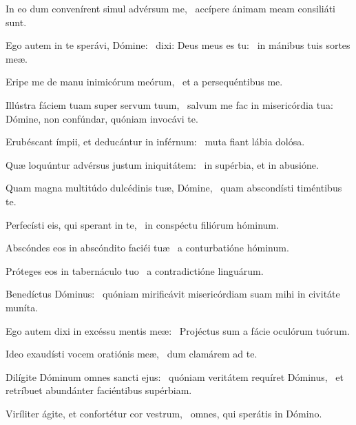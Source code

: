 \item In eo dum convenírent simul advérsum me,~\psstar{} accípere ánimam meam consiliáti sunt.

\item Ego autem in te sperávi, Dómine:~\pscross{} dixi: Deus meus es tu:~\psstar{} in mánibus tuis sortes meæ.

\item Eripe me de manu inimicórum meórum,~\psstar{} et a persequéntibus me.

\item Illústra fáciem tuam super servum tuum,~\pscross{} salvum me fac in misericórdia tua:~\psstar{} Dómine, non confúndar, quóniam invocávi te.

\item Erubéscant ímpii, et deducántur in inférnum:~\psstar{} muta fiant lábia dolósa.

\item Quæ loquúntur advérsus justum iniquitátem:~\psstar{} in supérbia, et in abusióne.

\item Quam magna multitúdo dulcédinis tuæ, Dómine,~\psstar{} quam abscondísti timéntibus te.

\item Perfecísti eis, qui sperant in te,~\psstar{} in conspéctu filiórum hóminum.

\item Abscóndes eos in abscóndito faciéi tuæ~\psstar{} a conturbatióne hóminum.

\item Próteges eos in tabernáculo tuo~\psstar{} a contradictióne linguárum.

\item Benedíctus Dóminus:~\psstar{} quóniam mirificávit misericórdiam suam mihi in civitáte muníta.

\item Ego autem dixi in excéssu mentis meæ:~\psstar{} Projéctus sum a fácie oculórum tuórum.

\item Ideo exaudísti vocem oratiónis meæ,~\psstar{} dum clamárem ad te.

\item Dilígite Dóminum omnes sancti ejus:~\pscross{} quóniam veritátem requíret Dóminus,~\psstar{} et retríbuet abundánter faciéntibus supérbiam.

\item Viríliter ágite, et confortétur cor vestrum,~\psstar{} omnes, qui sperátis in Dómino.

